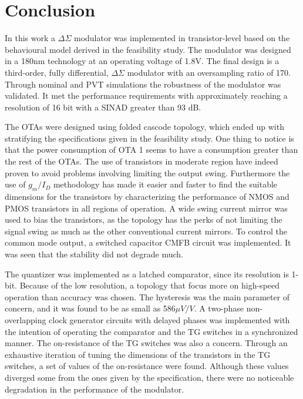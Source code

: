 \chapter{Conclusion}\label{Conclusion}

In this work a $\Delta\Sigma$ modulator was implemented in transistor-level based on the behavioural model derived in the feasibility study. The modulator was designed in a 180nm technology at an operating voltage of 1.8V. The final design is a third-order, fully differential, $\Delta\Sigma$ modulator with an oversampling ratio of 170. Through nominal and PVT simulations the robustness of the modulator was validated. It met the performance requirements with approximately reaching a resolution of 16 bit with a SINAD greater than 93 dB.

The OTAs were designed using folded cascode topology, which ended up with stratifying the specifications given in the feasibility study. One thing to notice is that the power consumption of OTA 1 seems to have a consumption greater than the rest of the OTAs. The use of transistors in moderate region have indeed proven to avoid problems involving limiting the output swing. Furthermore the use of $g_m/I_D$ methodology has made it easier and faster to find the suitable dimensions for the transistors by characterizing the performance of NMOS and PMOS transistors in all regions of operation. A wide swing current mirror was used to bias the transistors, as the topology has the perks of not limiting the signal swing as much as the other conventional current mirrors. To control the common mode output, a switched capacitor CMFB circuit was implemented. It was seen that the stability did not degrade much.  

The quantizer was implemented as a latched comparator, since its resolution is 1-bit. Because of the low resolution, a topology that focus more on high-speed operation than accuracy was chosen. The hysteresis was the main parameter of concern, and it was found to be as small as 586$\mu V/V$. A two-phase non-overlapping clock generator circuits with delayed phases was implemented with the intention of operating the comparator and the TG switches in a synchronized manner. The on-resistance of the TG switches was also a concern. Through an exhaustive iteration of tuning the dimensions of the transistors in the TG switches, a set of values of the on-resistance were found. Although these values diverged some from the ones given by the specification, there were no noticeable degradation in the performance of the modulator. 

